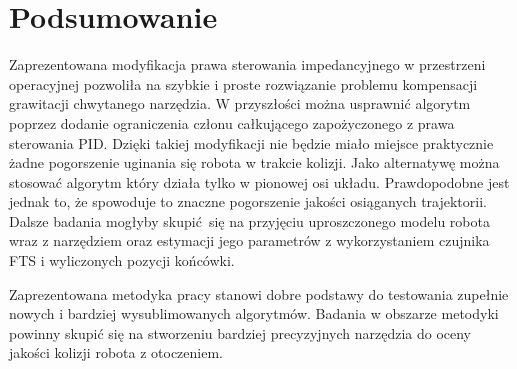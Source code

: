 
\chapter{Podsumowanie\label{chap:podsumowanie}}

Zaprezentowana modyfikacja prawa sterowania impedancyjnego w przestrzeni operacyjnej pozwoliła na szybkie i proste rozwiązanie problemu kompensacji grawitacji chwytanego narzędzia. W przyszłości można usprawnić algorytm poprzez dodanie ograniczenia członu całkującego zapożyczonego z prawa sterowania PID. Dzięki takiej modyfikacji nie będzie miało miejsce praktycznie żadne pogorszenie uginania się robota w trakcie kolizji. Jako alternatywę można stosować algorytm który działa tylko w pionowej osi układu. Prawdopodobne jest jednak to, że spowoduje to znaczne pogorszenie jakości osiąganych trajektorii.  Dalsze badania mogłyby skupić się na przyjęciu uproszczonego modelu robota wraz z narzędziem oraz estymacji jego parametrów z wykorzystaniem czujnika FTS i wyliczonych pozycji końcówki.

Zaprezentowana metodyka pracy stanowi dobre podstawy do testowania zupełnie nowych i bardziej wysublimowanych algorytmów.  Badania w obszarze metodyki powinny skupić się na stworzeniu bardziej precyzyjnych narzędzia do oceny jakości kolizji robota z otoczeniem.  